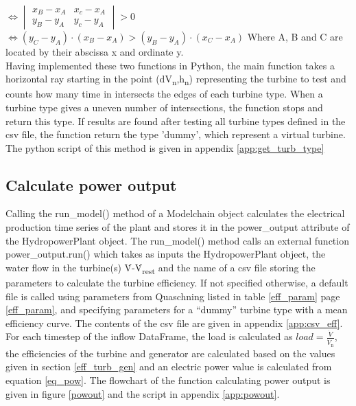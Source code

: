\tabto{2.5cm}$\iff \begin{vmatrix}x_B-x_A&x_c-x_A\\y_B-y_A&y_c-y_A\end{vmatrix}>0$\newline\\
\tabto{2.5cm}$\iff (y_C-y_A)\cdot(x_B-x_A) > (y_B-y_A)\cdot(x_C-x_A)$ \newline
Where A, B and C are located by their abscissa x and ordinate y. \newline
\\
Having implemented these two functions in Python, the main function takes a horizontal ray starting in the point (dV\textsubscript{n},h\textsubscript{n}) representing the turbine to test and counts how many time in intersects the edges of each turbine type. When a turbine type gives a uneven number of intersections, the function stops and return this type. If results are found after testing all turbine types defined in the csv file, the function return the type 'dummy', which represent a virtual turbine. \newline
The python script of this method is given in appendix \ref{app:get_turb_type}


\subsection{Calculate power output}

Calling the run{\_}model() method of a Modelchain object calculates the electrical production time series of the plant and stores it in the power{\_}output attribute of the HydropowerPlant object. The run{\_}model() method calls an external function power{\_}output.run() which takes as inputs the HydropowerPlant object, the water flow in the turbine(s) \.{V}-\.{V}\textsubscript{rest} and the name of a csv file storing the parameters to calculate the turbine efficiency. If not specified otherwise, a default file is called using parameters from Quaschning \cite{quaschning} listed in table \ref{eff_param} page \ref{eff_param}, and specifying parameters for a ``dummy'' turbine type with a mean efficiency curve. The contents of the csv file are given in appendix \ref{app:csv_eff}. \newline
For each timestep of the inflow DataFrame, the load is calculated as $load = \frac{\dot{V}}{\dot{V}_\mathrm{n}}$, the efficiencies of the turbine and generator are calculated based on the values given in section \ref{eff_turb_gen} and an electric power value is calculated from equation \ref{eq_pow}. The flowchart of the function calculating power output is given in figure \ref{powout} and the script in appendix \ref{app:powout}.

